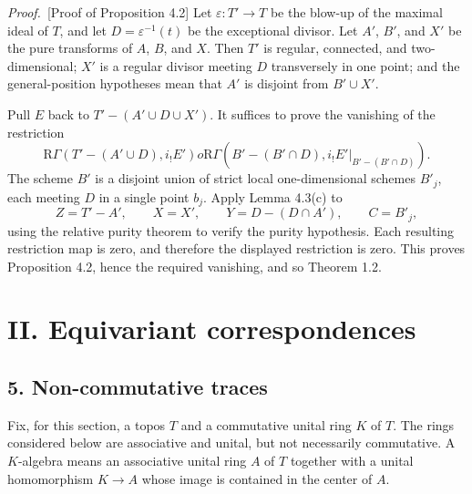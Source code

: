 \documentclass[11pt]{article}
\theoremstyle{plain}
\theoremstyle{definition}
\theoremstyle{remark}
\newenvironment{prooftext}{\par\noindent\textit{Proof.}\ }{\par\medskip}
\newcommand{\R}{\mathrm R}
\begin{document}
\begin{prooftext}[Proof of Proposition 4.2]
Let $\varepsilon:T'\to T$ be the blow-up of the maximal ideal of $T$, and let $D=\varepsilon^{-1}(t)$ be the exceptional divisor. Let $A'$, $B'$, and $X'$ be the pure transforms of $A$, $B$, and $X$. Then $T'$ is regular, connected, and two-dimensional; $X'$ is a regular divisor meeting $D$ transversely in one point; and the general-position hypotheses mean that $A'$ is disjoint from $B'\cup X'$.

Pull $E$ back to $T'-(A'\cup D\cup X')$. It suffices to prove the vanishing of the restriction
\[
   \R\Gamma(T'-(A'\cup D),i_!E')	o
   \R\Gamma(B'-(B'\cap D),i_!E'|_{B'-(B'\cap D)}).
\]
The scheme $B'$ is a disjoint union of strict local one-dimensional schemes $B'_j$, each meeting $D$ in a single point $b_j$. Apply Lemma 4.3(c) to
\[
   Z=T'-A',\qquad X=X',\qquad Y=D-(D\cap A'),\qquad C=B'_j,
\]
using the relative purity theorem to verify the purity hypothesis. Each resulting restriction map is zero, and therefore the displayed restriction is zero. This proves Proposition 4.2, hence the required vanishing, and so Theorem 1.2.
\end{prooftext}

\section*{II. Equivariant correspondences}

\subsection*{5. Non-commutative traces}
Fix, for this section, a topos $T$ and a commutative unital ring $K$ of $T$. The rings considered below are associative and unital, but not necessarily commutative. A $K$-algebra means an associative unital ring $A$ of $T$ together with a unital homomorphism $K\to A$ whose image is contained in the center of $A$.
\end{document}
